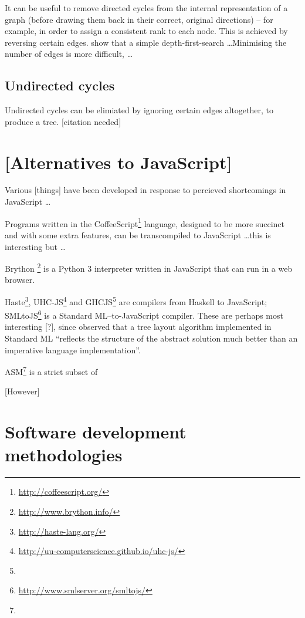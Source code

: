 \documentclass[authoryearcitations]{UoYCSproject}
\begin{document}
It can be useful to remove directed cycles from the internal representation of a graph
(before drawing them back in their correct, original directions)
-- for example, in order to assign a consistent rank to each node.
This is achieved by reversing certain edges.
\citet{gansner1993} show that a simple depth-first-search \ldots  Minimising the number of edges is more difficult, \citeauthor{gansner1993} \ldots

\subsection{Undirected cycles}

Undirected cycles can be elimiated by ignoring certain edges altogether, to produce a tree.  [citation needed]



\section{[Alternatives to JavaScript]}

Various [things] have been developed in response to percieved shortcomings in JavaScript \ldots

Programs written in the CoffeeScript\footnote{\url{http://coffeescript.org/}} language, designed to be more succinct and with some extra features, can be transcompiled to JavaScript \ldots this is interesting but \ldots

Brython \footnote{\url{http://www.brython.info/}} is a Python 3 interpreter written in JavaScript that can run in a web browser. 

Haste\footnote{\url{http://haste-lang.org/}}, UHC-JS\footnote{\url{http://uu-computerscience.github.io/uhc-js/}} and GHCJS\footnote{} are compilers from Haskell to JavaScript; SMLtoJS\footnote{\url{http://www.smlserver.org/smltojs/}} is a Standard ML--to-JavaScript compiler. These are perhaps most interesting [?], since \citet{kennedyfuntrees} observed that a tree layout algorithm implemented in Standard ML ``reflects the structure of the abstract solution much better than an imperative language implementation''.



ASM\footnote{} is a strict subset of 

[However]


\section{Software development methodologies}
\end{document}
